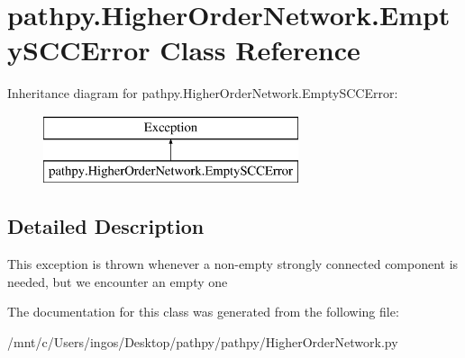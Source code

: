 \hypertarget{classpathpy_1_1HigherOrderNetwork_1_1EmptySCCError}{\section{pathpy.\-Higher\-Order\-Network.\-Empty\-S\-C\-C\-Error Class Reference}
\label{classpathpy_1_1HigherOrderNetwork_1_1EmptySCCError}
}
Inheritance diagram for pathpy.\-Higher\-Order\-Network.\-Empty\-S\-C\-C\-Error\-:\begin{figure}[H]
\begin{center}
\leavevmode
\includegraphics[height=2.000000cm]{classpathpy_1_1HigherOrderNetwork_1_1EmptySCCError}
\end{center}
\end{figure}


\subsection{Detailed Description}
\begin{DoxyVerb}This exception is thrown whenever a non-empty strongly 
connected component is needed, but we encounter an empty one
\end{DoxyVerb}
 

The documentation for this class was generated from the following file\-:\begin{DoxyCompactItemize}
\item 
/mnt/c/\-Users/ingos/\-Desktop/pathpy/pathpy/Higher\-Order\-Network.\-py\end{DoxyCompactItemize}
